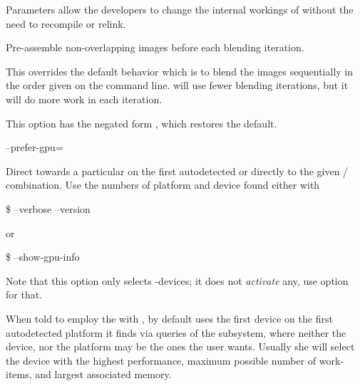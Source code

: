 \begin{codelist}
  Parameters allow the developers to change the internal workings of \App{} without the need to
  recompile or relink.


\ifenblend
    \label{opt:pre-assemble}%
  \item[\itempar{-a \\ --pre-assemble}]\itemend
    Pre-assemble non-overlapping images before
    each blending iteration.

    This overrides
    the default behavior which is to blend the images sequentially in the order given on the
    command line.  \App{} will use fewer blending iterations, but it will do more work in each
    iteration.

    This option has the negated form %
    , which restores the default.
\fi


  \label{opt:prefer-gpu}%
\item[--prefer-gpu=\optional{\metavar{PLATFORM}:}\metavar{DEVICE}
  \restrictednote{\acronym{OpenCL}-enabled versions only.}]\itemend

  Direct \App{} towards a particular 
   on the first autodetected
   or directly to the given
  \slash{} combination.  Use the numbers of platform and device
  found either with

  \begin{terminal}
    \$ \app{} --verbose --version
  \end{terminal}
  or
  \begin{terminal}
    \$ \app{} --show-gpu-info
  \end{terminal}

  Note that this option only selects -devices; it does not \emph{activate} any, use
  option~ for that.

  When told to employ the  with , by default \App{} uses the first
  device on the first autodetected platform it finds via queries of the 
  subsystem, where neither the device, nor the platform may be the ones the user wants.  Usually
  she will select the device with the highest performance, maximum possible number of
  work-items, and largest associated memory.



\end{codelist}
